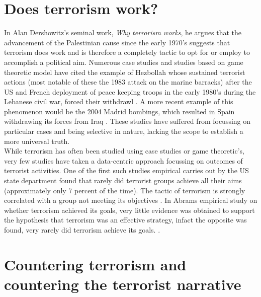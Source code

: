 \section{Does terrorism work?}
In Alan Dershowitz's seminal work, \textit{Why terrorism works}, he argues that the advancement of the Palestinian cause since the early 1970's \citep{dershowitz2002terrorism} suggests that terrorism does work and is therefore a completely tactic to opt for or employ to accomplish a political aim.  Numerous case studies and studies based on game theoretic model have cited the example of Hezbollah whose sustained terrorist actions (most notable of these the 1983 attack on the marine barracks) after the US and French deployment of peace keeping troops in the early 1980's during the Lebanese civil war, forced their  withdrawl \citep{atran2004trends}. A more recent example of this phenomenon would be the 2004 Madrid bombings, which resulted in Spain withdrawing its forces from Iraq \citep{rose2007does}. These studies have suffered from focussing on particular cases and being selective in nature, lacking the scope to establish a more universal truth.
\\
While terrorism has often been studied using case studies or game theoretic's, very few studies have taken a data-centric approach focussing on outcomes of terrorist activities. One of the first such studies empirical carries out by the US state department found that rarely  did terrorist groups achieve all their aims (approximately only 7 percent of the time). The tactic of terrorism is strongly correlated with a group not meeting its objectives \citep{cronin2004foreign}. In Abrams empirical study on whether terrorism achieved its goals, very little evidence was obtained to support the hypothesis that terrorism was an effective strategy, infact the opposite was found, very rarely did terrorism achieve its goals. \citep{abrahms2006terrorism}.

\section{Countering terrorism and countering the terrorist narrative}

